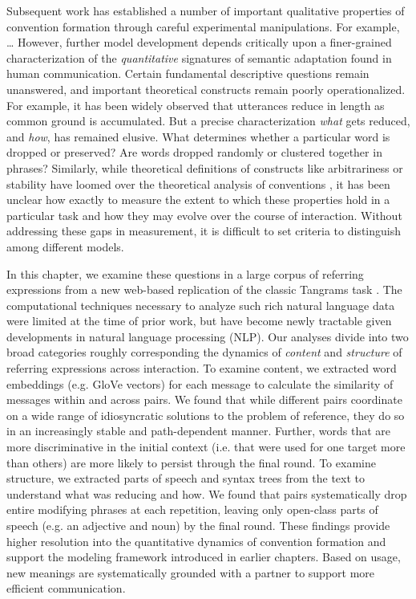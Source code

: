 \documentclass[alpha-refs]{wiley-article}
\begin{document}
Subsequent work has established a number of important qualitative properties of convention formation through careful experimental manipulations.
For example, \dots {}
However, further model development depends critically upon a finer-grained characterization of the \emph{quantitative} signatures of semantic adaptation found in human communication. 
Certain fundamental descriptive questions remain unanswered, and important theoretical constructs remain poorly operationalized. 
For example, it has been widely observed that utterances reduce in length as common ground is accumulated.
But a precise characterization \emph{what} gets reduced, and \emph{how}, has remained elusive.
What determines whether a particular word is dropped or preserved? 
Are words dropped randomly or clustered together in phrases?
Similarly, while theoretical definitions of constructs like arbitrariness or stability have loomed over the theoretical analysis of conventions \citep{Lewis69_Convention}, it has been unclear how exactly to measure the extent to which these properties hold in a particular task and how they may evolve over the course of interaction. 
Without addressing these gaps in measurement, it is difficult to set criteria to distinguish among different models.

In this chapter, we examine these questions in a large corpus of referring expressions from a new web-based replication of the classic Tangrams task \citep{ClarkWilkesGibbs86_ReferringCollaborative}.
The computational techniques necessary to analyze such rich natural language data were limited at the time of prior work, but have become newly tractable given developments in natural language processing (NLP). 
Our analyses divide into two broad categories roughly corresponding the dynamics of \emph{content} and \emph{structure} of referring expressions across interaction.
To examine content, we extracted word embeddings (e.g. GloVe vectors) for each message to calculate the similarity of messages within and across pairs. 
We found that while different pairs coordinate on a wide range of idiosyncratic solutions to the problem of reference, they do so in an increasingly stable and path-dependent manner. 
Further, words that are more discriminative in the initial context (i.e. that were used for one target more than others) are more likely to persist through the final round. 
To examine structure, we extracted parts of speech and syntax trees from the text to understand what was reducing and how.
We found that pairs systematically drop entire modifying phrases at each repetition, leaving only open-class parts of speech (e.g. an adjective and noun) by the final round. 
These findings provide higher resolution into the quantitative dynamics of convention formation and support the modeling framework introduced in earlier chapters. 
Based on usage, new meanings are systematically grounded with a partner to support more efficient communication.
\end{document}
